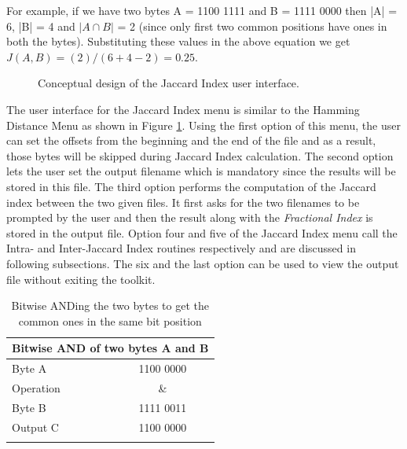 	For example, if we have two bytes A = 1100 1111 and B = 1111 0000 then |A| = 6, |B| = 4 and $|A \cap B|$ = 2 (since only first two common positions have ones in both the bytes). Substituting these values in the above equation we get $J(A,B) = (2) / ( 6 + 4 - 2) = 0.25$.\\

	\begin{figure}[h]
	\centering
	\caption{Conceptual design of the Jaccard Index user interface.}
	\label{img:jaccard_ui}
	\end{figure}

	The user interface for the Jaccard Index menu is similar to the Hamming Distance Menu as shown in Figure \ref{img:jaccard_ui}. Using the first option of this menu, the user can set the offsets from the beginning and the end of the file and as a result, those bytes will be skipped during Jaccard Index calculation. The second option lets the user set the output filename which is mandatory since the results will be stored in this file. The third option performs the computation of the Jaccard index between the two given
	files. It first asks for the two filenames to be prompted by the user and then the result along with the \emph{Fractional Index} is stored in the output file. Option four and five of the Jaccard Index menu call the Intra- and Inter-Jaccard Index routines respectively and are discussed in following subsections. The six and the last option can be used to view the output file without exiting the toolkit.\\

	\begin{table}[!b]
	\begin{center}
	\begin{tabular}{lc}
	\toprule
	\multicolumn{2}{c}{\textbf{Bitwise AND of two bytes A and B}}\\
	\midrule
	Byte A &   1100 0000 \\
	Operation & \&\\
	Byte B &   1111 0011 \\
	Output C &   1100 0000 \\
	\addlinespace
	\bottomrule
	\end{tabular}
	\end{center}
	\caption{Bitwise ANDing the two bytes to get the common ones in the same bit position}
	\label{bitwise_AND}
	\end{table}

